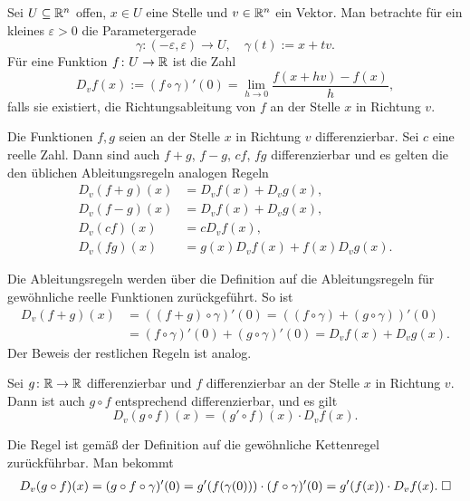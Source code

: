 \begin{Definition}[Richtungsableitung]
Sei $U\subseteq\mathbb R^n$ offen, $x\in U$ eine Stelle und $v\in\mathbb R^n$
ein Vektor. Man betrachte für ein kleines $\varepsilon>0$
die Parametergerade
\[\gamma\colon(-\varepsilon,\varepsilon)\to U,\quad \gamma(t):=x+tv.\]
Für eine Funktion $f\colon U\to\mathbb R$ ist die Zahl
\[D_v f(x) := (f\circ\gamma)'(0) = \lim_{h\to 0}\frac{f(x+hv)-f(x)}{h},\]
falls sie existiert, die Richtungsableitung von $f$ an der Stelle $x$ in
Richtung $v$.
\end{Definition}
\begin{Satz}
Die Funktionen $f,g$ seien an der Stelle $x$ in Richtung $v$
differenzierbar. Sei $c$ eine reelle Zahl. Dann sind auch
$f+g$, $f-g$, $cf$, $fg$ differenzierbar und es gelten die
den üblichen Ableitungsregeln analogen Regeln
\begin{align*}
D_v(f+g)(x) &= D_v f(x)+D_v g(x),\\
D_v(f-g)(x) &= D_v f(x)+D_v g(x),\\
D_v(cf)(x) &= cD_v f(x),\\
D_v(fg)(x) &= g(x)D_v f(x) + f(x)D_v g(x).
\end{align*}
\end{Satz}
\begin{Beweis}
Die Ableitungsregeln werden über die Definition
auf die Ableitungsregeln für gewöhnliche reelle Funktionen
zurückgeführt. So ist
\begin{align*}
D_v(f+g)(x) &= ((f+g)\circ\gamma)'(0)
= ((f\circ\gamma)+(g\circ\gamma))'(0)\\
&= (f\circ\gamma)'(0)+(g\circ\gamma)'(0)
= D_v f(x) + D_v g(x).
\end{align*}
Der Beweis der restlichen Regeln ist analog.\,\qedsymbol
\end{Beweis}

\begin{Satz}[Kettenregel]\newlinefirst
Sei $g\colon\mathbb R\to\mathbb R$ differenzierbar und
$f$ differenzierbar an der Stelle $x$ in Richtung $v$. Dann ist
auch $g\circ f$ entsprechend differenzierbar, und es gilt
\[D_v(g\circ f)(x) = (g'\circ f)(x)\cdot D_v f(x).\]
\end{Satz}
\begin{Beweis}
Die Regel ist gemäß der Definition auf die gewöhnliche Kettenregel
zurückführbar. Man bekommt
\begin{align*}
D_v(g\circ f)(x) = (g\circ f\circ\gamma)'(0)
= g'(f(\gamma(0)))\cdot (f\circ\gamma)'(0)
= g'(f(x))\cdot D_v f(x).\;\square
\end{align*}
\end{Beweis}

